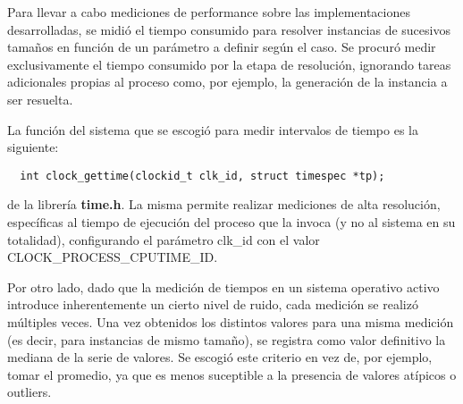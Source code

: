 Para llevar a cabo mediciones de performance sobre las implementaciones desarrolladas, se midió el tiempo consumido para resolver instancias de sucesivos tamaños en función de un parámetro a definir según el caso. Se procuró medir exclusivamente el tiempo consumido por la etapa de resolución, ignorando tareas adicionales propias al proceso como, por ejemplo, la generación de la instancia a ser resuelta.

La función del sistema que se escogió para medir intervalos de tiempo es la siguiente:

\begin{verbatim}
  int clock_gettime(clockid_t clk_id, struct timespec *tp);
\end{verbatim}

de la librería \textbf{time.h}. La misma permite realizar mediciones de alta resolución, específicas al tiempo de ejecución del proceso que la invoca (y no al sistema en su totalidad), configurando el parámetro clk\_id con el valor CLOCK\_PROCESS\_CPUTIME\_ID.

Por otro lado, dado que la medición de tiempos en un sistema operativo activo introduce inherentemente un cierto nivel de ruido, cada medición se realizó múltiples veces. Una vez obtenidos los distintos valores para una misma medición (es decir, para instancias de mismo tamaño), se registra como valor definitivo la mediana de la serie de valores. Se escogió este criterio en vez de, por ejemplo, tomar el promedio, ya que es menos suceptible a la presencia de valores atípicos o outliers.